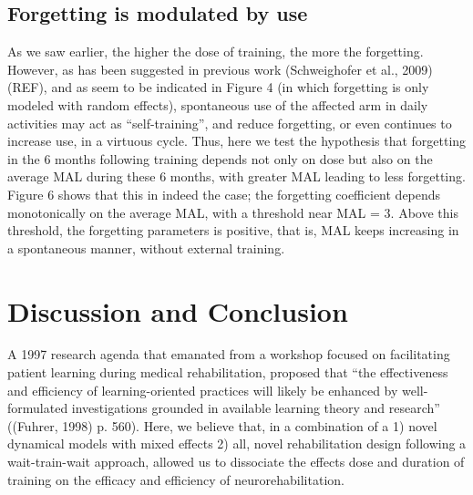 \subsection{Forgetting is modulated by use}
As we saw earlier, the higher the dose of training, the more the forgetting. 
However, as has been suggested in previous work (Schweighofer et al., 2009)(REF), and as seem to be indicated in Figure 4 (in which forgetting is only modeled with random effects), spontaneous use of the affected arm in daily activities may act as “self-training”, and reduce forgetting, or even continues to increase use, in a virtuous cycle. 
Thus, here we test the hypothesis that forgetting in the 6 months following training depends not only on dose but also on the average MAL during these 6 months, with greater MAL leading to less forgetting. 
Figure 6 shows that this in indeed the case; the forgetting coefficient depends monotonically on the average MAL, with a threshold near MAL = 3. 
Above this threshold, the forgetting parameters is positive, that is, MAL keeps increasing in a spontaneous manner, without external training.


\section{Discussion and Conclusion}
A 1997 research agenda that emanated from a workshop focused on facilitating patient learning during medical rehabilitation, proposed that “the effectiveness and efficiency of learning-oriented practices will likely be enhanced by well-formulated investigations grounded in available learning theory and research” ((Fuhrer, 1998) p. 560). 
Here, we believe that, in a combination of a 1) novel dynamical models with mixed effects 2) all, novel rehabilitation design following a wait-train-wait approach,  allowed us to dissociate the effects dose and duration of training on the efficacy and efficiency of neurorehabilitation.


